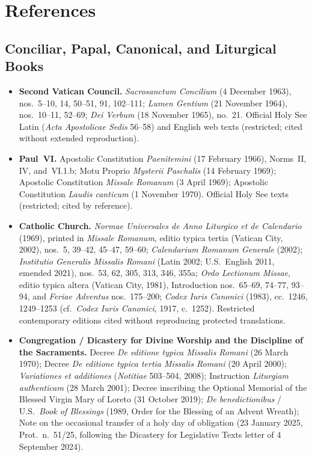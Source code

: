 \section{References}\label{sec:references}

\subsection*{Conciliar, Papal, Canonical, and Liturgical Books}

\begin{itemize}
\item \textbf{Second Vatican Council.} \textit{Sacrosanctum Concilium} (4 December 1963), nos.~5--10, 14, 50--51, 91, 102--111; \textit{Lumen Gentium} (21 November 1964), nos.~10--11, 52--69; \textit{Dei Verbum} (18 November 1965), no.~21. Official Holy See Latin (\textit{Acta Apostolicae Sedis} 56--58) and English web texts (restricted; cited without extended reproduction).
\item \textbf{Paul~VI.} Apostolic Constitution \textit{Paenitemini} (17 February 1966), Norms~II, IV, and~VI.1.b; Motu Proprio \textit{Mysterii Paschalis} (14 February 1969); Apostolic Constitution \textit{Missale Romanum} (3 April 1969); Apostolic Constitution \textit{Laudis canticum} (1 November 1970). Official Holy See texts (restricted; cited by reference).
\item \textbf{Catholic Church.} \textit{Normae Universales de Anno Liturgico et de Calendario} (1969), printed in \textit{Missale Romanum}, editio typica tertia (Vatican City, 2002), nos.~5, 39--42, 45--47, 59--60; \textit{Calendarium Romanum Generale} (2002); \textit{Institutio Generalis Missalis Romani} (Latin 2002; U.S.~English 2011, emended 2021), nos.~53, 62, 305, 313, 346, 355a; \textit{Ordo Lectionum Missae}, editio typica altera (Vatican City, 1981), Introduction nos.~65--69, 74--77, 93--94, and \textit{Feriae Adventus} nos.~175--200; \textit{Codex Iuris Canonici} (1983), cc.~1246, 1249--1253 (cf.~\textit{Codex Iuris Canonici}, 1917, c.~1252). Restricted contemporary editions cited without reproducing protected translations.
\item \textbf{Congregation / Dicastery for Divine Worship and the Discipline of the Sacraments.} Decree \textit{De editione typica Missalis Romani} (26 March 1970); Decree \textit{De editione typica tertia Missalis Romani} (20 April 2000); \textit{Variationes et additiones} (\textit{Notitiae} 503--504, 2008); Instruction \textit{Liturgiam authenticam} (28 March 2001); Decree inscribing the Optional Memorial of the Blessed Virgin Mary of Loreto (31 October 2019); \textit{De benedictionibus} / U.S.~\textit{Book of Blessings} (1989, Order for the Blessing of an Advent Wreath); Note on the occasional transfer of a holy day of obligation (23 January 2025, Prot.~n.~51/25, following the Dicastery for Legislative Texts letter of 4 September 2024).

\end{itemize}
